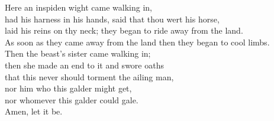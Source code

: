 \bvb Here an inspiden wight came walking in, \\
had his harness in his hands, said that thou wert his horse, \\
laid his reins on thy neck; they began to ride away from the land. \\
As soon as they came away from the land then they began to cool limbs. \\
Then the beast’s sister came walking in; \\
then she made an end to it and swore oaths \\
that this never should torment the ailing man, \\
nor him who this galder might get, \\
nor whomever this galder could gale. \\
Amen, let it be.\evb\evg

\sectionline
